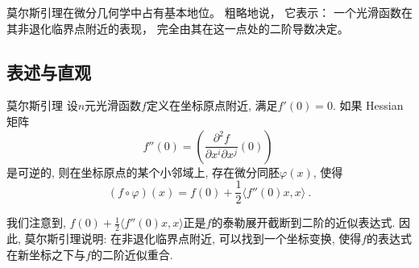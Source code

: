 
\begin{issues}
\issueTODO
\issueDraft
\end{issues}


莫尔斯引理在微分几何学中占有基本地位。 粗略地说， 它表示： 一个光滑函数在其非退化临界点附近的表现， 完全由其在这一点处的二阶导数决定。

\subsection{表述与直观}
\begin{lemma}{莫尔斯引理}
设$n$元光滑函数$f$定义在坐标原点附近, 满足$f'(0)=0$. 如果 Hessian 矩阵
$$
f''(0)=\left(\frac{\partial^2f}{\partial x^i\partial x^j}(0)\right)~
$$
是可逆的, 则在坐标原点的某个小邻域上, 存在微分同胚$\varphi(x)$, 使得
$$
(f\circ\varphi)(x)=f(0)+\frac{1}{2}\langle f''(0)x,x\rangle~.
$$
\end{lemma}

我们注意到, $f(0)+\frac{1}{2}\langle f''(0)x,x\rangle$正是$f$的泰勒展开截断到二阶的近似表达式. 因此, 莫尔斯引理说明: 在非退化临界点附近, 可以找到一个坐标变换, 使得$f$的表达式在新坐标之下与$f$的二阶近似重合.

